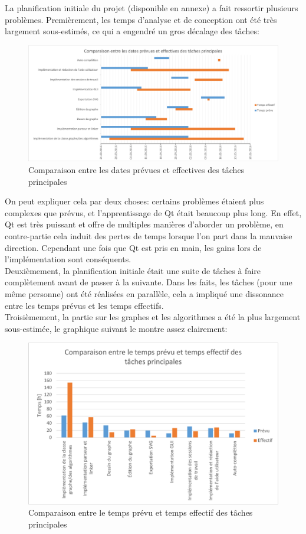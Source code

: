 \documentclass[french]{article}
\begin{document}
			La planification initiale du projet (disponible en annexe) a fait ressortir plusieurs problèmes. Premièrement, les temps d'analyse et de conception ont été très largement sous-estimés, ce qui a engendré un gros décalage des tâches:
			\begin{figure}[H]
				\includegraphics[width=\textwidth]{Planification/comparaisondates.pdf}
				\caption{Comparaison entre les dates prévues et effectives des tâches principales}
				\label{fig:comparaisondates}
			\end{figure}
			On peut expliquer cela par deux choses: certains problèmes étaient plus complexes que prévus, et l'apprentissage de Qt était beaucoup plus long. En effet, Qt est très puissant et offre de multiples manières d'aborder un problème, en contre-partie cela induit des pertes de temps lorsque l'on part dans la mauvaise direction. Cependant une fois que Qt est pris en main, les gains lors de l'implémentation sont conséquents.\\ 
			
			Deuxièmement, la planification initiale était une suite de tâches à faire complètement avant de passer à la suivante. Dans les faits, les tâches (pour une même personne) ont été réalisées en parallèle, cela a impliqué une dissonance entre les temps prévus et les temps effectifs.\\
			
			Troisièmement, la partie sur les graphes et les algorithmes a été la plus largement sous-estimée, le graphique suivant le montre assez clairement:
			\begin{figure}[H]
				\includegraphics[width=\textwidth]{Planification/comparaisonheures.pdf}
				\caption{Comparaison entre le temps prévu et temps effectif des tâches
					principales}
				\label{fig:comparaisonheures}
			\end{figure}
			
\end{document}
